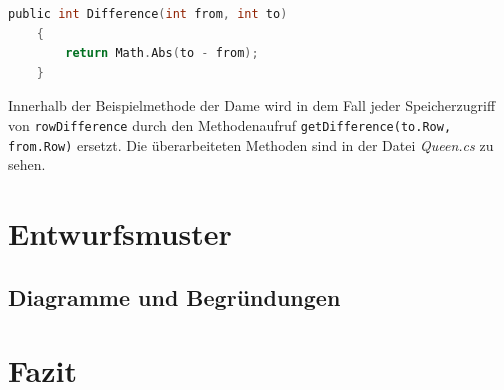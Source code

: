 \documentclass[
10pt, %
a4paper, %
oneside, %
headinclude,footinclude, %
BCOR5mm, %
]{scrartcl}
\begin{document}
\begin{lstlisting}[language=c, style=mStyle]
public int Difference(int from, int to)
	{
		return Math.Abs(to - from);
	}
\end{lstlisting}

Innerhalb der Beispielmethode der Dame wird in dem Fall jeder Speicherzugriff von \texttt{rowDifference} durch den Methodenaufruf \texttt{getDifference(to.Row, from.Row)} ersetzt. Die überarbeiteten Methoden sind in der Datei \textit{Queen.cs} zu sehen. 
\section{Entwurfsmuster}
\subsection{Diagramme und Begründungen}

\section{Fazit}\label{sec:end}


%


\end{document}

